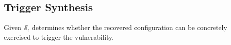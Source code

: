 


\subsection{Trigger Synthesis}
Given $\mathcal{S}$, \sys
determines whether the recovered configuration can be concretely
exercised to trigger the vulnerability.








